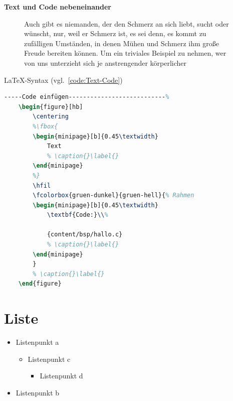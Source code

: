 \clearpage
\textbf{Text und Code nebeneinander}\\

\begin{figure}[hb]
	\centering
	\begin{minipage}[b]{0.45\textwidth}
		Auch gibt es niemanden, der den Schmerz an sich liebt, sucht oder wünscht, nur, weil er Schmerz ist, es sei denn, es kommt zu zufälligen Umständen, in denen Mühen und Schmerz ihm große Freude bereiten können. Um ein triviales Beispiel zu nehmen, wer von uns unterzieht sich je anstrengender körperlicher
	\end{minipage}
	\hfil
\end{figure}

\LaTeX -Syntax (vgl.~\ref{code:Text-Code})

\begin{lstlisting}[language=TeX,% C, TeX, Bash, Python
caption={Text und Code nebeneinander},label={code:Text-Code}%
]-----Code einfügen---------------------------%
	\begin{figure}[hb]
		\centering
		%\fbox{
		\begin{minipage}[b]{0.45\textwidth}
			Text
			% \caption{}\label{}
		\end{minipage}
		%}
		\hfil
		\fcolorbox{gruen-dunkel}{gruen-hell}{% Rahmen
		\begin{minipage}[b]{0.45\textwidth} 
			\textbf{Code:}\\%
			
			{content/bsp/hallo.c}
			% \caption{}\label{}
		\end{minipage}
		}
		% \caption{}\label{}
	\end{figure}
\end{lstlisting}


\clearpage
\section{Liste}

\begin{itemize}
	\item Listenpunkt a
	\begin{itemize}
		\item Listenpunkt c
		\begin{itemize}
			\item Listenpunkt d
		\end{itemize}
	\end{itemize}
	\item Listenpunkt b
\end{itemize}


